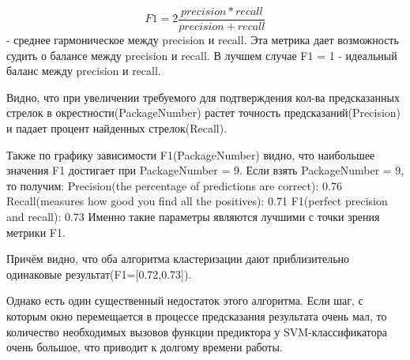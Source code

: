 \begin{equation}
F1 = 2 \dfrac{precision * recall}{precision + recall}
\end{equation} - среднее гармоническое между precision и recall. Эта метрика дает возможность судить о балансе между precision и recall. В лучшем случае F1 = 1 - идеальный баланс между precision и recall.

Видно, что при увеличении требуемого для подтверждения кол-ва предсказанных стрелок в окрестности(PackageNumber) растет точность предсказаний(Precision) и падает процент найденных стрелок(Recall).

Также по графику зависимости F1(PackageNumber) видно, что наибольшее значения F1 достигает при PackageNumber = 9. 
Если взять PackageNumber = 9, то получим:\newline
Precision(the percentage of predictions are correct): 0.76\newline
Recall(measures how good you find all the positives): 0.71\newline
F1(perfect precision and recall): 0.73\newline
Именно такие параметры являются лучшими с точки зрения метрики F1.

Причём видно, что оба алгоритма кластеризации дают приблизительно одинаковые результат(F1=[0.72,0.73]). 

Однако есть один существенный недостаток этого алгоритма. Если шаг, с которым окно перемещается в процессе предсказания результата очень мал, то количество необходимых вызовов функции предиктора у SVM-классификатора очень большое, что приводит к долгому времени работы.

